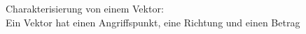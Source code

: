 \newcommand{\titleinfo}{Physik 1 - Zusammenfassung}
\newcommand{\authorinfo}{C. van der Geest}
\newcommand{\versioninfo}{$Rev: 1.0 $ | 
						gem\"ass Unterricht HS2017}

%


\usepackage{tikz}








Charakterisierung von einem Vektor: \\
Ein Vektor hat einen Angriffspunkt, eine Richtung und einen Betrag 




